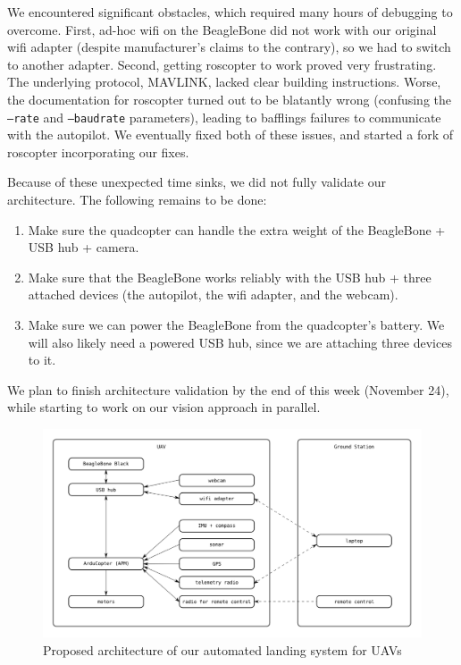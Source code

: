 \documentclass[10pt, twocolumn]{scrartcl} %
\begin{document}
We encountered significant obstacles, which required many hours of debugging to
overcome. First, ad-hoc wifi on the BeagleBone did not work with our original
wifi adapter (despite manufacturer's claims to the contrary), so we had to
switch to another adapter. Second, getting roscopter to work proved very
frustrating. The underlying protocol, MAVLINK, lacked clear building
instructions. Worse, the documentation for roscopter turned out to be blatantly
wrong (confusing the {\tt --rate} and {\tt --baudrate} parameters), leading to
bafflings failures to communicate with the autopilot. We eventually fixed both
of these issues, and started a fork of roscopter incorporating our fixes.

Because of these unexpected time sinks, we did not fully validate our
architecture. The following remains to be done:

\begin{enumerate}
\item Make sure the quadcopter can handle the extra weight of the BeagleBone +
      USB hub + camera.
\item Make sure that the BeagleBone works reliably with the USB hub + three
      attached devices (the autopilot, the wifi adapter, and the webcam).
\item Make sure we can power the BeagleBone from the quadcopter's battery.
      We will also likely need a powered USB hub, since we are attaching three
      devices to it.
\end{enumerate}

We plan to finish architecture validation by the end of this week (November
24), while starting to work on our vision approach in parallel.

\begin{figure}[h]
    \centering
    \includegraphics[width=\textwidth]{architecture.png}
    \caption{Proposed architecture of our automated landing system for UAVs}
    \label{fig:architecture}
\end{figure}
\end{document}
